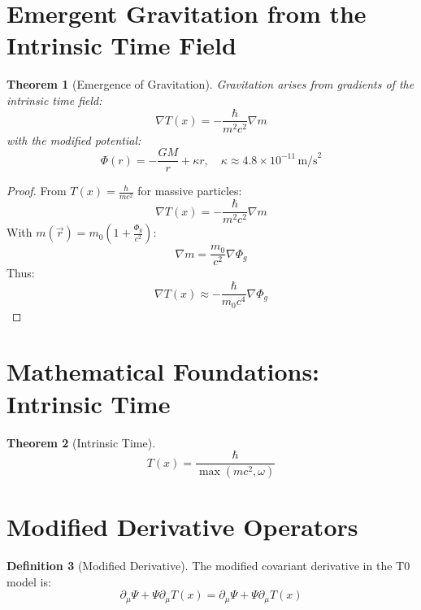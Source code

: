 \documentclass[12pt,a4paper]{article}
\newcommand{\Tfield}{T(x)}
\newcommand{\DcovT}[1]{\partial_\mu #1 + #1 \partial_\mu \Tfield}
\newtheorem{theorem}{Theorem}[section]
\theoremstyle{definition}
\newtheorem{definition}[theorem]{Definition}
\theoremstyle{remark}
\begin{document}
	\section{Emergent Gravitation from the Intrinsic Time Field}
	\begin{theorem}[Emergence of Gravitation]
		Gravitation arises from gradients of the intrinsic time field:
		\begin{equation}
			\nabla \Tfield = -\frac{\hbar}{m^2 c^2} \nabla m
		\end{equation}
		with the modified potential:
		\begin{equation}
			\Phi(r) = -\frac{GM}{r} + \kappa r, \quad \kappa \approx 4.8 \times 10^{-11} \, \text{m/s}^2
		\end{equation}
	\end{theorem}
	
	\begin{proof}
		From \( \Tfield = \frac{\hbar}{m c^2} \) for massive particles:
		\begin{equation}
			\nabla \Tfield = -\frac{\hbar}{m^2 c^2} \nabla m
		\end{equation}
		With \( m(\vec{r}) = m_0 (1 + \frac{\Phi_g}{c^2}) \):
		\begin{equation}
			\nabla m = \frac{m_0}{c^2} \nabla \Phi_g
		\end{equation}
		Thus:
		\begin{equation}
			\nabla \Tfield \approx -\frac{\hbar}{m_0 c^4} \nabla \Phi_g
		\end{equation}
	\end{proof}
	
	\section{Mathematical Foundations: Intrinsic Time}
	\begin{theorem}[Intrinsic Time]
		\begin{equation}
			\Tfield = \frac{\hbar}{\max(m c^2, \omega)}
		\end{equation}
	\end{theorem}
	
	\section{Modified Derivative Operators}
	\begin{definition}[Modified Derivative]
		The modified covariant derivative in the T0 model is:
		\begin{equation}
			\DcovT{\Psi} = \partial_\mu \Psi + \Psi \partial_\mu \Tfield
		\end{equation}
	\end{definition}
	
\end{document}
